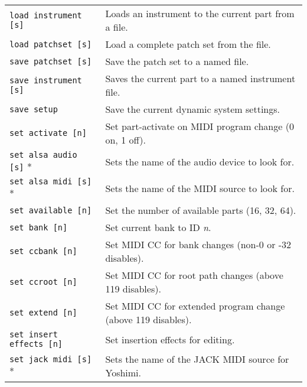 \begin{table}[H]
\begin{tabular}{l l}
         \texttt{load instrument [s]} &
            Loads an instrument to the current part from a file. \\

         \texttt{load patchset [s]} &
            Load a complete patch set from the file. \\

         \texttt{save patchset [s]} &
            Save the patch set to a named file. \\

         \texttt{save instrument [s]} &
            Saves the current part to a named instrument file. \\

         \texttt{save setup} &
            Save the current dynamic system settings. \\

         \texttt{set activate [n]} &
            Set part-activate on MIDI program change (0 on, 1 off). \\

         \texttt{set alsa audio [s]} * &
            Sets the name of the audio device to look for. \\

         \texttt{set alsa midi [s]} * &
            Sets the name of the MIDI source to look for. \\

         \texttt{set available [n]} &
            Set the number of available parts (16, 32, 64). \\

         \texttt{set bank [n]} &
            Set current bank to ID \textsl{n}. \\

         \texttt{set ccbank [n]} &
            Set MIDI CC for bank changes (non-0 or -32 disables). \\

         \texttt{set ccroot [n]} &
            Set MIDI CC for root path changes (above 119 disables). \\

         \texttt{set extend [n]} &
            Set MIDI CC for extended program change (above 119 disables). \\

         \texttt{set insert effects [n]} &
            Set insertion effects for editing. \\

         \texttt{set jack midi [s]} * &
            Sets the name of the JACK MIDI source for Yoshimi. \\


\end{tabular}
\end{table}

